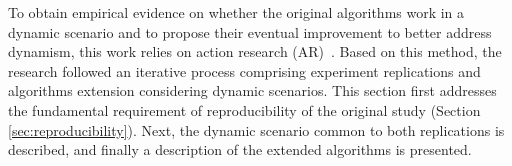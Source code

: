 
To obtain empirical evidence on whether the original algorithms work in a dynamic scenario and to propose their eventual improvement to better address dynamism, this work relies on action research (AR)~\citep{action_research}. Based on this method, the research followed an iterative process comprising experiment replications and algorithms extension considering dynamic scenarios. This section first addresses the fundamental requirement of reproducibility of the original study (Section \ref{sec:reproducibility}). Next, the dynamic scenario common to both replications is described, and finally a description of the  extended algorithms is presented. 
